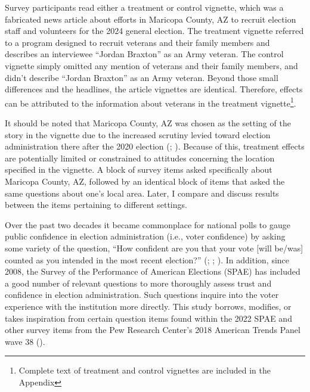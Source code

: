 \documentclass[
  12pt,
  letterpaper,
]{article}
\begin{document}
Survey participants read either a treatment or control vignette, which
was a fabricated news article about efforts in Maricopa County, AZ to
recruit election staff and volunteers for the 2024 general election. The
treatment vignette referred to a program designed to recruit veterans
and their family members and describes an interviewee ``Jordan Braxton''
as an Army veteran. The control vignette simply omitted any mention of
veterans and their family members, and didn't describe ``Jordan
Braxton'' as an Army veteran. Beyond those small differences and the
headlines, the article vignettes are identical. Therefore, effects can
be attributed to the information about veterans in the treatment
vignette\footnote{Complete text of treatment and control vignettes are
  included in the Appendix}.

It should be noted that Maricopa County, AZ was chosen as the setting of
the story in the vignette due to the increased scrutiny levied toward
election administration there after the 2020 election
(;
). Because of this, treatment effects are
potentially limited or constrained to attitudes concerning the location
specified in the vignette. A block of survey items asked specifically
about Maricopa County, AZ, followed by an identical block of items that
asked the same questions about one's local area. Later, I compare and
discuss results between the items pertaining to different settings.

Over the past two decades it became commonplace for national polls to
gauge public confidence in election administration (i.e., voter
confidence) by asking some variety of the question, ``How confident are
you that your vote {[}will be/was{]} counted as you intended in the most
recent election?'' (; ;
). In addition, since 2008, the
Survey of the Performance of American Elections (SPAE) has included a
good number of relevant questions to more thoroughly assess trust and
confidence in election administration. Such questions inquire into the
voter experience with the institution more directly. This study borrows,
modifies, or takes inspiration from certain question items found within
the 2022 SPAE and other survey items from the Pew Research Center's 2018
American Trends Panel wave 38 ().
\end{document}

